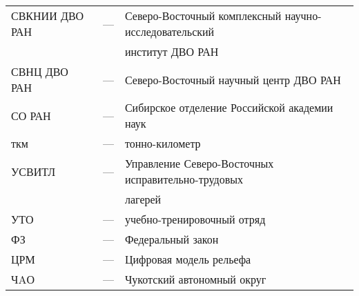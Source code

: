 \begin{changemargin}{-1.5cm}{-1cm}
\begin{tabular}{l c l}
  СВКНИИ ДВО РАН & --- & Северо-Восточный комплексный научно-исследовательский \\ & &
  институт ДВО РАН\\
  СВНЦ ДВО РАН & --- & Северо-Восточный научный центр ДВО РАН \\
  СО РАН & --- & Сибирское отделение Российской академии наук \medskip\\
  ткм & --- & тонно-километр \medskip \\
  УСВИТЛ & --- & Управление Северо-Восточных исправительно-трудовых\\ & & лагерей \\
  УТО & --- & учебно-тренировочный отряд \medskip \\
  ФЗ & --- & Федеральный закон \medskip \\
  ЦРМ& --- & Цифровая модель рельефа \medskip  \\
  ЧAО & --- & Чукотский автономный округ

\end{tabular}
\end{changemargin}
\thispagestyle{empty}
